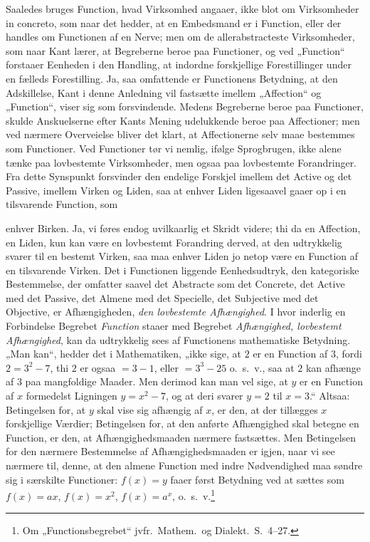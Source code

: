 \documentclass[12pt]{book}
\newcommand{\opage}[1]{\marginnote{\footnotesize\textit{[#1]}}}
\begin{document}
\opage{277} Saaledes bruges Function, hvad Virksomhed angaaer, ikke blot om Virksomheder in concreto, som naar det
hedder, at en Embedsmand er i Function, eller der handles om Functionen af en Nerve; men om de
allerabstracteste Virksomheder, som naar Kant lærer, at Begreberne beroe paa Functioner, og ved
„Function“ forstaaer Eenheden i den Handling, at indordne forskjellige Forestillinger under en fælleds
Forestilling. Ja, saa omfattende er Functionens Betydning, at den Adskillelse, Kant i denne Anledning
vil fastsætte imellem „Affection“ og „Function“, viser sig som forsvindende. Medens Begreberne beroe
paa Functioner, skulde Anskuelserne efter Kants Mening udelukkende beroe paa Affectioner; men ved
nærmere Overveielse bliver det klart, at Affectionerne selv maae bestemmes som Functioner. Ved
Functioner tør vi nemlig, ifølge Sprogbrugen, ikke alene tænke paa lovbestemte Virksomheder, men ogsaa
paa lovbestemte Forandringer. Fra dette Synspunkt forsvinder den endelige Forskjel imellem det Active
og det Passive, imellem Virken og Liden, saa at enhver Liden ligesaavel gaaer op i en tilsvarende
Function, som

\opage{278} enhver Birken. Ja, vi føres endog uvilkaarlig et Skridt videre; thi da en Affection, en Liden, kun kan
være en lovbestemt Forandring derved, at den udtrykkelig svarer til en bestemt Virken, saa maa enhver
Liden jo netop være en Function af en tilsvarende Virken. Det i Functionen liggende Eenhedsudtryk, den
kategoriske Bestemmelse, der omfatter saavel det Abstracte som det Concrete, det Active med det
Passive, det Almene med det Specielle, det Subjective med det Objective, er Afhængigheden, \emph{den
lovbestemte Afhængighed}. I hvor inderlig en Forbindelse Begrebet \emph{Function} staaer med Begrebet
\emph{Afhængighed, lovbestemt Afhængighed}, kan da udtrykkelig sees af Functionens mathematiske
Betydning. „Man kan“, hedder det i Mathematiken, „ikke sige, at $2$ er en Function af $3$, fordi $2 =
3^{2} - 7$, thi $2$ er ogsaa $= 3 - 1$, eller $= 3^{3} - 25$ o.\ s.\ v., saa at $2$ kan afhænge af $3$
paa mangfoldige Maader. Men derimod kan man vel sige, at $y$ er en Function af $x$ formedelst Ligningen
$y = x^{2} - 7$, og at deri svarer $y = 2$ til $x = 3$.“ Altsaa: Betingelsen for, at $y$ skal vise sig
afhængig af $x$, er den, at der tillægges $x$ forskjellige Værdier; Betingelsen for, at den anførte
Afhængighed skal betegne en Function, er den, at Afhængighedsmaaden nærmere fastsættes. Men Betingelsen
for den nærmere Bestemmelse af Afhængighedsmaaden er igjen, naar vi see nærmere til, denne, at den
almene Function med indre Nødvendighed maa søndre sig i særskilte Functioner: $f(x) = y$ faaer først
Betydning ved at sættes som $f(x) = ax$, $f(x) = x^{2}$, $f(x) = a^{x}$, o.\ s.\ v.\footnote{Om
„Functionsbegrebet“ jvfr.\ Mathem.\ og Dialekt.\ S.~4--27.}
\end{document}
